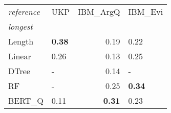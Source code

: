\begin{tabular}{llrl}
\toprule
\textit{reference} &   UKP &  IBM\_ArgQ & IBM\_Evi \\
\textit{longest}  &       &           &         \\
\midrule
Length &  \textbf{0.38} &      0.19 &    0.22 \\
Linear &  0.26 &      0.13 &    0.25 \\
DTree  &     - &      0.14 &       - \\
RF     &     - &      0.25 &    \textbf{0.34} \\
BERT\_Q &  0.11 &      \textbf{0.31} &    0.23 \\
\bottomrule
\end{tabular}
